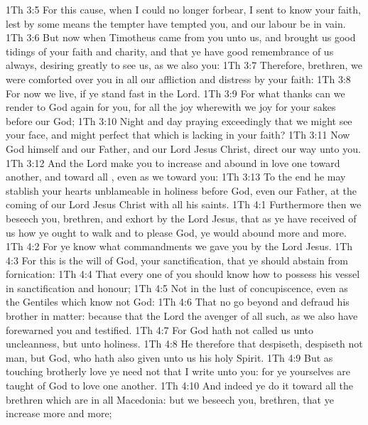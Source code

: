 \vs 1Th 3:5 For this cause, when I could no longer forbear, I sent to know your faith, lest by some means the tempter have tempted you, and our labour be in vain.
\vs 1Th 3:6 But now when Timotheus came from you unto us, and brought us good tidings of your faith and charity, and that ye have good remembrance of us always, desiring greatly to see us, as we also  you:
\vs 1Th 3:7 Therefore, brethren, we were comforted over you in all our affliction and distress by your faith:
\vs 1Th 3:8 For now we live, if ye stand fast in the Lord.
\vs 1Th 3:9 For what thanks can we render to God again for you, for all the joy wherewith we joy for your sakes before our God;
\vs 1Th 3:10 Night and day praying exceedingly that we might see your face, and might perfect that which is lacking in your faith?
\vs 1Th 3:11 Now God himself and our Father, and our Lord Jesus Christ, direct our way unto you.
\vs 1Th 3:12 And the Lord make you to increase and abound in love one toward another, and toward all , even as we  toward you:
\vs 1Th 3:13 To the end he may stablish your hearts unblameable in holiness before God, even our Father, at the coming of our Lord Jesus Christ with all his saints.
\vs 1Th 4:1 Furthermore then we beseech you, brethren, and exhort  by the Lord Jesus, that as ye have received of us how ye ought to walk and to please God,  ye would abound more and more.
\vs 1Th 4:2 For ye know what commandments we gave you by the Lord Jesus.
\vs 1Th 4:3 For this is the will of God,  your sanctification, that ye should abstain from fornication:
\vs 1Th 4:4 That every one of you should know how to possess his vessel in sanctification and honour;
\vs 1Th 4:5 Not in the lust of concupiscence, even as the Gentiles which know not God:
\vs 1Th 4:6 That no  go beyond and defraud his brother in  matter: because that the Lord  the avenger of all such, as we also have forewarned you and testified.
\vs 1Th 4:7 For God hath not called us unto uncleanness, but unto holiness.
\vs 1Th 4:8 He therefore that despiseth, despiseth not man, but God, who hath also given unto us his holy Spirit.
\vs 1Th 4:9 But as touching brotherly love ye need not that I write unto you: for ye yourselves are taught of God to love one another.
\vs 1Th 4:10 And indeed ye do it toward all the brethren which are in all Macedonia: but we beseech you, brethren, that ye increase more and more;
